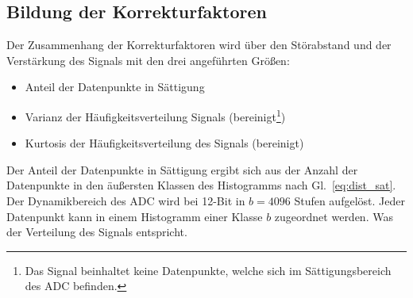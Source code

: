 %
 
\subsection{Bildung der Korrekturfaktoren}
Der Zusammenhang der Korrekturfaktoren wird über den Störabstand und der Verstärkung des Signals mit den drei angeführten Größen: 

\begin{itemize}
	\item Anteil der Datenpunkte in Sättigung %
	\item Varianz der Häufigkeitsverteilung Signals (bereinigt\footnote[1]{Das Signal beinhaltet keine Datenpunkte, welche sich im Sättigungsbereich des ADC befinden.\label{foot:bereinigt}})
	\item Kurtosis der Häufigkeitsverteilung des Signals (bereinigt)
	\end{itemize}


Der Anteil der Datenpunkte in Sättigung ergibt sich aus der Anzahl der Datenpunkte in den äußersten Klassen des Histogramms nach Gl.~\ref{eq:dist_sat}. Der Dynamikbereich des ADC wird bei 12-Bit in $b=4096$ Stufen aufgelöst. Jeder Datenpunkt kann in einem Histogramm einer Klasse $b$ zugeordnet werden. Was der Verteilung des Signals entspricht. 

